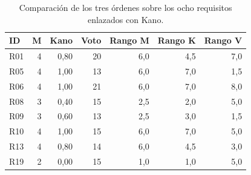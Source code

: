 \begin{table}[H]
\centering
\footnotesize
\caption{Comparación de los tres órdenes sobre los ocho requisitos enlazados con Kano.}
\label{tab:comparacion}
\begin{tabular}{@{}lrrrrrr@{}}
\toprule
ID & M & Kano & Voto & Rango M & Rango K & Rango V \\
\midrule
R01 & 4 & 0,80 & 20 & 6,0 & 4,5 & 7,0 \\
R05 & 4 & 1,00 & 13 & 6,0 & 7,0 & 1,5 \\
R06 & 4 & 1,00 & 21 & 6,0 & 7,0 & 8,0 \\
R08 & 3 & 0,40 & 15 & 2,5 & 2,0 & 5,0 \\
R09 & 3 & 0,60 & 13 & 2,5 & 3,0 & 1,5 \\
R10 & 4 & 1,00 & 15 & 6,0 & 7,0 & 5,0 \\
R13 & 4 & 0,80 & 14 & 6,0 & 4,5 & 3,0 \\
R19 & 2 & 0,00 & 15 & 1,0 & 1,0 & 5,0 \\
\bottomrule
\end{tabular}
\end{table}
